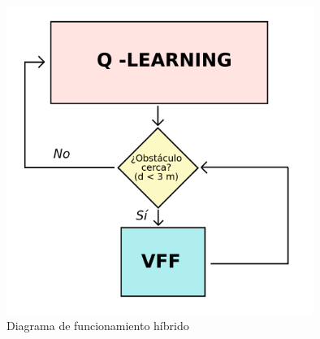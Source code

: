 \begin{figure} [tp]
    \begin{center}
    \includegraphics[height=10cm]{imagenes/cap4/29_hyb.png}
    \end{center}
    \caption[Diagrama de funcionamiento híbrido]{Diagrama de funcionamiento híbrido}
    \label{fig:hyb}
\end{figure}

